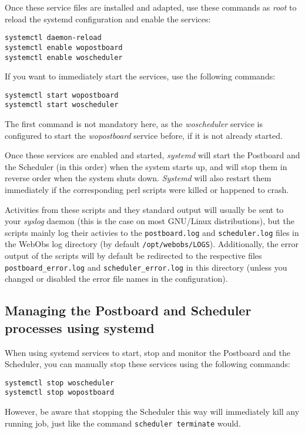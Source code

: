 Once these service files are installed and adapted, use these commands as
\textit{root} to reload the systemd configuration and enable the services:
\begin{lstlisting}[style=console]
systemctl daemon-reload
systemctl enable wopostboard
systemctl enable woscheduler
\end{lstlisting}

If you want to immediately start the services, use the following commands:
\begin{lstlisting}[style=console]
systemctl start wopostboard
systemctl start woscheduler
\end{lstlisting}
The first command is not mandatory here, as the \textit{woscheduler} service is
configured to start the \textit{wopostboard} service before, if it is not
already started.

Once these services are enabled and started, \textit{systemd} will start the
Postboard and the Scheduler (in this order) when the system starts up, and will
stop them in reverse order when the system shuts down. \textit{Systemd} will
also restart them immediately if the corresponding perl scripts were killed or
happened to crash.

Activities from these scripts and they standard output will
usually be sent to your \textit{syslog} daemon (this is the case on most
GNU/Linux distributions), but the scripts mainly log their activies to the
\texttt{postboard.log} and \texttt{scheduler.log} files in the WebObs log
directory (by default \texttt{/opt/webobs/LOGS}). Additionally, the error
output of the scripts will by default be redirected to the respective files
\texttt{postboard\_error.log} and \texttt{scheduler\_error.log} in this
directory (unless you changed or disabled the error file names in the
configuration).

\subsection*{Managing the Postboard and Scheduler processes using systemd}

When using systemd services to start, stop and monitor the Postboard and the
Scheduler, you can manually stop these services using the following commands:
\begin{lstlisting}[style=console]
systemctl stop woscheduler
systemctl stop wopostboard
\end{lstlisting}
However, be aware that stopping the Scheduler this way will immediately kill
any running job, just like the command \texttt{scheduler terminate} would.

